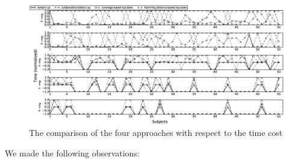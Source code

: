 \documentclass[conference]{IEEEtran}
\theoremstyle{definition}
\begin{document}
\begin{figure}[htbp]
\center
 \includegraphics[width=7.4in]{time-degree.eps}
\caption{The comparison of  the four approaches with respect to the time cost}
\label{experiement_time}
\end{figure}


We made the following observations:
\end{document}

